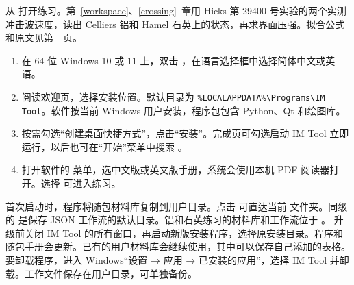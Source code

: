 \newcommand{\booktitle}{用户手册}
\newcommand{\tocname}{目录}
\newcommand{\chapword}{第 \thesection\ 章}

\color{ink}
\tableofcontents
{}
从  打开练习。第~\ref{workspace}、\ref{crossing}~章用 Hicks 第 29400 号实验的两个实测冲击波速度，读出 Celliers 铝和 Hamel 石英上的状态，再求界面压强。拟合公式和原文见第~\pageref{sources}~页。

\begin{enumerate}
\item 在 64 位 Windows 10 或 11 上，双击 ，在语言选择框中选择简体中文或英语。
\item 阅读欢迎页，选择安装位置。默认目录为 \verb|%LOCALAPPDATA%\Programs\IM Tool|。软件按当前 Windows 用户安装，程序包包含 Python、Qt 和绘图库。
\item 按需勾选“创建桌面快捷方式”，点击“安装”。完成页可勾选启动 IM Tool 立即运行，以后也可在“开始”菜单中搜索 。
\item 打开软件的  菜单，选中文版或英文版手册，系统会使用本机 PDF 阅读器打开。选择  可进入练习。
\end{enumerate}
首次启动时，程序将随包材料库复制到用户目录。点击  可直达当前  文件夹。同级的  是保存 JSON 工作流的默认目录。铝和石英练习的材料库和工作流位于 。
升级前关闭 IM Tool 的所有窗口，再启动新版安装程序，选择原安装目录。程序和随包手册会更新。已有的用户材料库会继续使用，其中可以保存自己添加的表格。要卸载程序，进入 Windows“设置 → 应用 → 已安装的应用”，选择 IM Tool 并卸载。工作文件保存在用户目录，可单独备份。

